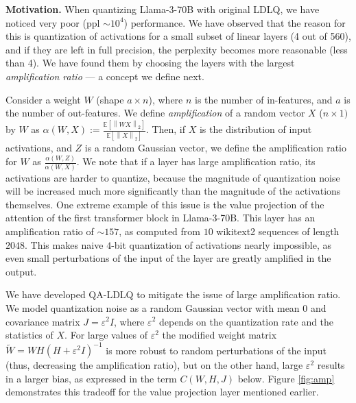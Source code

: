 \documentclass{article}
\def\EE{\mathbb{E}}
\newcommand{\eps}{\varepsilon}
\newcommand{\norm}[1]{\left\lVert#1\right\rVert}
\theoremstyle{plain}
\theoremstyle{definition}
\theoremstyle{remark}
\begin{document}
\label{sec:qa-ldlq-details}

\textbf{Motivation.} When quantizing Llama-3-70B with original LDLQ, we have noticed very poor (ppl $\sim 10^4$) performance. We have observed that the reason for this is quantization of activations for a small subset of linear layers (4 out of 560), and if they are left in full precision, the perplexity becomes more reasonable (less than 4). We have found them by choosing the layers with the largest \emph{amplification ratio} --- a concept we define next.

Consider a weight $W$ (shape $a \times n$), where $n$ is the number of in-features, and $a$ is the number of out-features. We define \emph{amplification} of a random vector $X$ ($n \times 1)$ by $W$ as $\alpha(W, X) := \frac{\EE[\norm{WX}_2]}{\EE[\norm{X}_2]}$. Then, if $X$ is the distribution of input activations, and $Z$ is a random Gaussian vector, we define the amplification ratio for $W$ as $\frac{\alpha(W, Z)}{\alpha(W, X)}$. We note that if a layer has large amplification ratio, its activations are harder to quantize, because the magnitude of quantization noise will be increased much more significantly than the magnitude of the activations themselves. One extreme example of this issue is the value projection of the attention of the first transformer block in Llama-3-70B. This layer has an amplification ratio of $\sim157$, as computed from $10$ wikitext2 sequences of length $2048$. This makes naive $4$-bit quantization of activations nearly impossible, as even small perturbations of the input of the layer are greatly amplified in the output.

We have developed QA-LDLQ to mitigate the issue of large amplification ratio. We model quantization noise as a random Gaussian vector with mean $0$ and covariance matrix $J = \eps^2 I$, where $\eps^2$ depends on the quantization rate and the statistics of $X$. For large values of $\eps^2$ the modified weight matrix $\tilde{W}=W H (H+\eps^2 I)^{-1}$ is more robust to random perturbations of the input (thus, decreasing the amplification ratio), but on the other hand, large $\eps^2$ results in a larger bias, as expressed in the term $C(W,H,J)$ below. Figure \ref{fig:amp} demonstrates this tradeoff for the value projection layer mentioned earlier.
\end{document}
